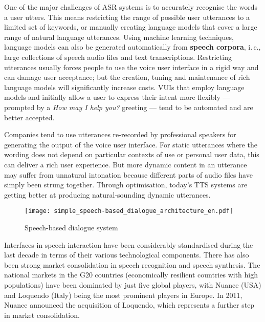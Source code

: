 \begin{multicols}{2}
One of the major challenges of ASR systems is to accurately recognise the words a user utters. This means restricting the range of possible user utterances to a limited set of keywords, or manually creating language models that cover a large range of natural language utterances. Using machine learning techniques, language models can also be generated automatically from \textbf{speech corpora}, i.\,e., large collections of speech audio files and text transcriptions. Restricting utterances usually forces people to use the voice user interface in a rigid way and can damage user acceptance; but the creation, tuning and maintenance of rich language models will significantly increase costs. VUIs that employ language models and initially allow a user to express their intent more flexibly — prompted by a \textit{How may I help you?} greeting — tend to be automated and are better accepted.

Companies tend to use utterances re-recorded by professional speakers for generating the output of the voice user interface. For static utterances where the wording does not depend on particular contexts of use or personal user data, this can deliver a rich user experience. But more dynamic content in an utterance may suffer from unnatural intonation because different parts of audio files have simply been strung together. Through optimisation, today’s TTS systems are getting better at producing natural-sounding dynamic utterances.


\begin{figure*}[t]
  \center
  \texttt{[image: simple\_speech-based\_dialogue\_architecture\_en.pdf]}
  \caption{Speech-based dialogue system}
  \label{fig:dialoguearch_en}
\end{figure*}

Interfaces in speech interaction have been considerably standardised during the last decade in terms of their various technological components. There has also been strong market consolidation in speech recognition and speech synthesis. The national markets in the G20 countries (economically resilient countries with high populations) have been dominated by just five global players, with Nuance (USA) and Loquendo (Italy) being the most prominent players in Europe. In 2011, Nuance announced the acquisition of Loquendo, which represents a further step in market consolidation.


\end{multicols}
